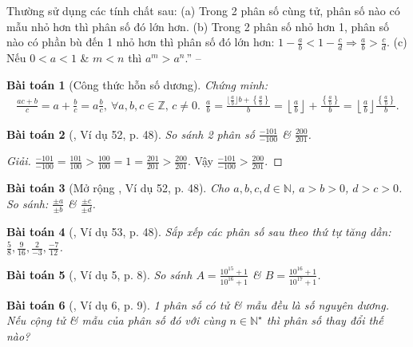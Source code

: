 \documentclass{article}
\newtheorem{baitoan}{Bài toán}
\begin{document}
Thường sử dụng các tính chất sau: (a) Trong 2 phân số cùng tử, phân số nào có mẫu nhỏ hơn thì phân số đó lớn hơn. (b) Trong 2 phân số nhỏ hơn 1, phân số nào có phần bù đến 1 nhỏ hơn thì phân số đó lớn hơn: $1 - \frac{a}{b} < 1 - \frac{c}{d}\Rightarrow\frac{a}{b} > \frac{c}{d}$. (c) Nếu $0 < a < 1$ \& $m < n$ thì $a^m > a^n$.'' -- \cite[Chap. 1, \S2, p. 8]{Binh_Toan_6_tap_2}

\begin{baitoan}[Công thức hỗn số dương]
	Chứng minh:
	\begin{align*}
		\frac{ac + b}{c} = a + \frac{b}{c} = a\frac{b}{c},\ \forall a,b,c\in\mathbb{Z},\,c\ne0.\ \ \frac{a}{b} = \frac{\lfloor\frac{a}{b}\rfloor b + \left\{\frac{a}{b}\right\}}{b} = \left\lfloor\frac{a}{b}\right\rfloor + \frac{\left\{\frac{a}{b}\right\}}{b} = \left\lfloor\frac{a}{b}\right\rfloor\frac{\left\{\frac{a}{b}\right\}}{b}.
	\end{align*}
\end{baitoan}

\begin{baitoan}[\cite{Tuyen_Toan_6}, Ví dụ 52, p. 48]
	So sánh 2 phân số $\frac{-101}{-100}$ \& $\frac{200}{201}$.
\end{baitoan}

\begin{proof}[Giải]
	$\frac{-101}{-100} = \frac{101}{100} > \frac{100}{100} = 1 = \frac{201}{201} > \frac{200}{201}$. Vậy $\frac{-101}{-100} > \frac{200}{201}$.
\end{proof}

\begin{baitoan}[Mở rộng \cite{Tuyen_Toan_6}, Ví dụ 52, p. 48]
	Cho $a,b,c,d\in\mathbb{N}$, $a > b > 0$, $d > c > 0$. So sánh: $\frac{\pm a}{\pm b}$ \& $\frac{\pm c}{\pm d}$.
\end{baitoan}

\begin{baitoan}[\cite{Tuyen_Toan_6}, Ví dụ 53, p. 48]
	Sắp xếp các phân số sau theo thứ tự tăng dần: $\frac{5}{8},\frac{9}{16},\frac{2}{-3},\frac{-7}{12}$.
\end{baitoan}

\begin{baitoan}[\cite{Binh_Toan_6_tap_2}, Ví dụ 5, p. 8]
	So sánh $A = \frac{10^{15} + 1}{10^{16} + 1}$ \& $B = \frac{10^{16} + 1}{10^{17} + 1}$.
\end{baitoan}

\begin{baitoan}[\cite{Binh_Toan_6_tap_2}, Ví dụ 6, p. 9]
	1 phân số có tử \& mẫu đều là số nguyên dương. Nếu cộng tử \& mẫu của phân số đó với cùng $n\in\mathbb{N}^\star$ thì phân số thay đổi thế nào?
\end{baitoan}
\end{document}
